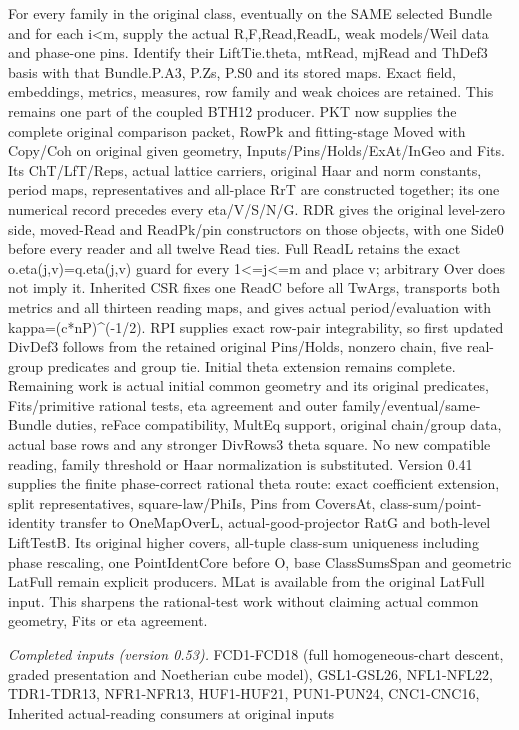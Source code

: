 \documentclass[11pt,a4paper]{article}
\numberwithin{equation}{section}
\theoremstyle{remark}\newtheorem{remark}[theorem]{Remark}
\begin{document}
For every family in the original class, eventually on the SAME selected Bundle and for each i<m, supply the actual R,F,Read,ReadL, weak models/Weil data and phase-one pins. Identify their LiftTie.theta, mtRead, mjRead and ThDef3 basis with that Bundle.P.A3, P.Zs, P.S0 and its stored maps. Exact field, embeddings, metrics, measures, row family and weak choices are retained. This remains one part of the coupled BTH12 producer. PKT now supplies the complete original comparison packet, RowPk and fitting-stage Moved with Copy/Coh on original given geometry, Inputs/Pins/Holds/ExAt/InGeo and Fits. Its ChT/LfT/Reps, actual lattice carriers, original Haar and norm constants, period maps, representatives and all-place RrT are constructed together; its one numerical record precedes every eta/V/S/N/G. RDR gives the original level-zero side, moved-Read and ReadPk/pin constructors on those objects, with one Side0 before every reader and all twelve Read ties. Full ReadL retains the exact o.eta(j,v)=q.eta(j,v) guard for every 1<=j<=m and place v; arbitrary Over does not imply it. Inherited CSR fixes one ReadC before all TwArgs, transports both metrics and all thirteen reading maps, and gives actual period/evaluation with kappa=(c*nP)\textasciicircum{}(-1/2). RPI supplies exact row-pair integrability, so first updated DivDef3 follows from the retained original Pins/Holds, nonzero chain, five real-group predicates and group tie. Initial theta extension remains complete. Remaining work is actual initial common geometry and its original predicates, Fits/primitive rational tests, eta agreement and outer family/eventual/same-Bundle duties, reFace compatibility, MultEq support, original chain/group data, actual base rows and any stronger DivRows3 theta square. No new compatible reading, family threshold or Haar normalization is substituted. Version 0.41 supplies the finite phase-correct rational theta route: exact coefficient extension, split representatives, square-law/PhiIs, Pins from CoversAt, class-sum/point-identity transfer to OneMapOverL, actual-good-projector RatG and both-level LiftTestB. Its original higher covers, all-tuple class-sum uniqueness including phase rescaling, one PointIdentCore before O, base ClassSumsSpan and geometric LatFull remain explicit producers. MLat is available from the original LatFull input. This sharpens the rational-test work without claiming actual common geometry, Fits or eta agreement.

\emph{Completed inputs (version 0.53).} FCD1-FCD18 (full homogeneous-chart descent, graded presentation and Noetherian cube model), GSL1-GSL26, NFL1-NFL22, TDR1-TDR13, NFR1-NFR13, HUF1-HUF21, PUN1-PUN24, CNC1-CNC16, Inherited actual-reading consumers at original inputs
\end{document}
